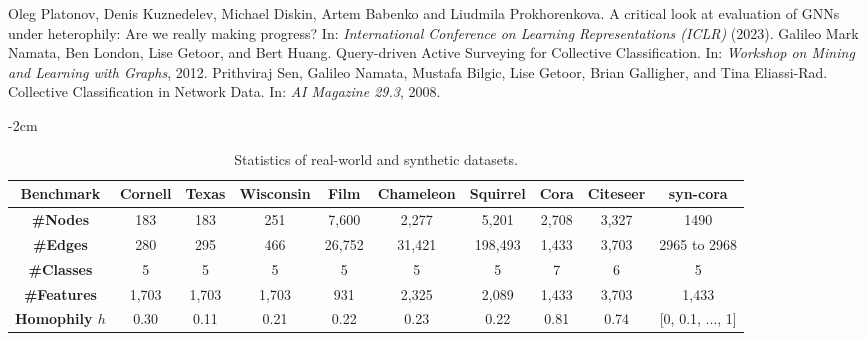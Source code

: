 \documentclass[conference]{IEEEtran}
\begin{document}
\begin{thebibliography}{00}
Oleg Platonov, Denis Kuznedelev, Michael Diskin, Artem Babenko and Liudmila Prokhorenkova. A critical look at evaluation of GNNs under heterophily: Are we really making progress? In: \textit{International Conference on Learning Representations (ICLR)} (2023).
Galileo Mark Namata, Ben London, Lise Getoor, and Bert Huang. Query-driven Active Surveying for Collective Classification. In: \textit{Workshop on Mining and Learning with Graphs}, 2012.
Prithviraj Sen, Galileo Namata, Mustafa Bilgic, Lise Getoor, Brian Galligher, and Tina Eliassi-Rad. Collective Classification in Network Data. In: \textit{AI Magazine 29.3}, 2008.
\end{thebibliography}

\appendices

\vspace{6cm}

\begin{table*}[t]
    \centering
    \footnotesize
    \addtolength{\leftskip} {-2cm}
    \addtolength{\rightskip}{-2cm}
\begin{tabular}{c c c c c c c c c c }
    \toprule
    \textbf{Benchmark} & \textbf{Cornell} & \textbf{Texas} & \textbf{Wisconsin} & \textbf{Film} & \textbf{Chameleon} & \textbf{Squirrel} & \textbf{Cora} & \textbf{Citeseer} & \textbf{syn-cora} \\
    \midrule
    \textbf{\#Nodes} & 183 & 183 & 251 & 7,600 & 2,277 & 5,201 & 2,708 & 3,327 & 1490 \\
    \textbf{\#Edges} & 280 & 295 & 466 & 26,752 & 31,421 & 198,493 & 1,433 & 3,703 & 2965 to 2968 \\
    \textbf{\#Classes} & 5 & 5 & 5 & 5 & 5 & 5 & 7 & 6 & 5 \\
    \textbf{\#Features} & 1,703 & 1,703 & 1,703 & 931 & 2,325 & 2,089 & 1,433 & 3,703 & 1,433 \\
    \textbf{Homophily \(h\)} & 0.30 & 0.11 & 0.21 & 0.22 & 0.23 & 0.22 & 0.81 & 0.74 & [0, 0.1, ..., 1] \\
    \bottomrule

    \end{tabular}
    \caption{Statistics of real-world and synthetic datasets.}
    \label{tab:data_stat}

\end{table*}
\end{document}
